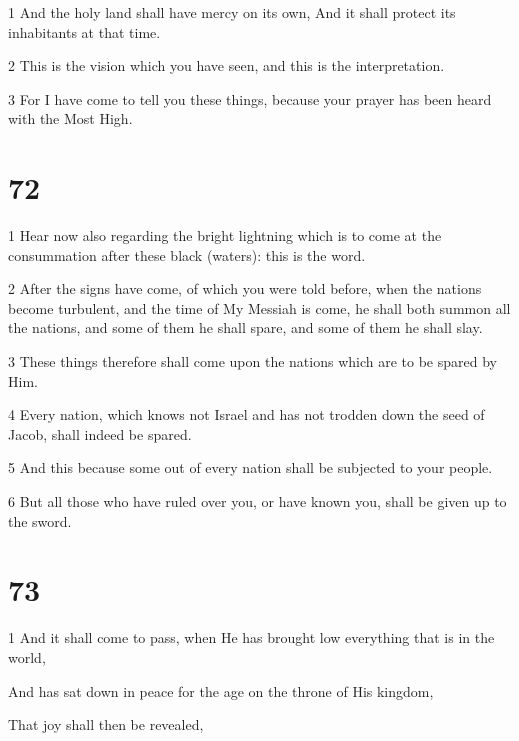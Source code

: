 \par 1 And the holy land shall have mercy on its own, And it shall protect its inhabitants at that time. 

\par 2 This is the vision which you have seen, and this is the interpretation. 

\par 3 For I have come to tell you these things, because your prayer has been heard with the Most High.

\chapter{72}

\par 1 Hear now also regarding the bright lightning which is to come at the consummation after these black (waters): this is the word. 

\par 2 After the signs have come, of which you were told before, when the nations become turbulent, and the time of My Messiah is come, he shall both summon all the nations, and some of them he shall spare, and some of them he shall slay. 

\par 3 These things therefore shall come upon the nations which are to be spared by Him. 

\par 4 Every nation, which knows not Israel and has not trodden down the seed of Jacob, shall indeed be spared. 

\par 5 And this because some out of every nation shall be subjected to your people. 

\par 6 But all those who have ruled over you, or have known you, shall be given up to the sword.

\chapter{73}

\par 1 And it shall come to pass, when He has brought low everything that is in the world,

\par And has sat down in peace for the age on the throne of His kingdom,

\par That joy shall then be revealed,


